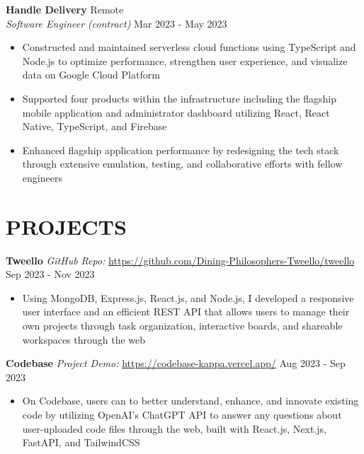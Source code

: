 \documentclass[a4paper,10pt]{extarticle}
\begin{document}
\noindent
\textbf{Handle Delivery} \hfill Remote\\ %
\textit{Software Engineer (contract)} \hfill Mar 2023 - May 2023 %
\begin{itemize}
    \item Constructed and maintained serverless cloud functions using TypeScript and Node.js to optimize performance, strengthen user experience, and visualize data on Google Cloud Platform
    \item Supported four products within the infrastructure including the flagship mobile application and administrator dashboard utilizing React, React Native, TypeScript, and Firebase
    \item Enhanced flagship application performance by redesigning the tech stack through extensive emulation, testing, and collaborative efforts with fellow engineers %
\end{itemize}

\section*{PROJECTS}
\noindent
\textbf{Tweello} %
\textit{GitHub Repo:} \url{https://github.com/Dining-Philosophers-Tweello/tweello} \hfill Sep 2023 - Nov 2023 %
\begin{itemize}
    \item Using MongoDB, Express.js, React.js, and Node.js, I developed a responsive user interface and an efficient REST API that allows users to manage their own projects through task organization, interactive boards, and shareable workspaces through the web %
\end{itemize}

\noindent
\textbf{Codebase} %
\textit{Project Demo:} \url{https://codebase-kappa.vercel.app/} \hfill Aug 2023 - Sep 2023 %
\begin{itemize}
    \item On Codebase, users can to better understand, enhance, and innovate existing code by utilizing OpenAI's ChatGPT API to answer any questions about user-uploaded code files through the web, built with React.js, Next.js, FastAPI, and TailwindCSS %
\end{itemize}

\end{document}
